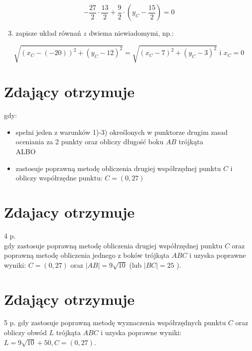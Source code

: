 \documentclass[10pt]{article}
\begin{document}
$$
-\frac{27}{2} \cdot \frac{13}{2}+\frac{9}{2} \cdot\left(y_{C}-\frac{15}{2}\right)=0
$$

\begin{enumerate}
  \setcounter{enumi}{2}
  \item zapisze układ równań $z$ dwiema niewiadomymi, np.:
\end{enumerate}

$$
\sqrt{\left(x_{C}-(-20)\right)^{2}+\left(y_{C}-12\right)^{2}}=\sqrt{\left(x_{C}-7\right)^{2}+\left(y_{C}-3\right)^{2}} \text { i } x_{C}=0
$$

\section*{Zdający otrzymuje}
gdy:

\begin{itemize}
  \item spełni jeden z warunków 1)-3) określonych w punktorze drugim zasad oceniania za 2 punkty oraz obliczy długość boku $A B$ trójkąta\\
ALBO
  \item zastosuje poprawną metodę obliczenia drugiej współrzędnej punktu $C$ i obliczy współrzędne punktu: $C=(0,27)$
\end{itemize}

\section*{Zdajacy otrzymuje}
4 p.\\
gdy zastosuje poprawną metodę obliczenia drugiej współrzędnej punktu $C$ oraz poprawną metodę obliczenia jednego z boków trójkąta $A B C$ i uzyska poprawne wyniki: $C=(0,27)$ oraz $|A B|=9 \sqrt{10}$ (lub $|B C|=25$ ).

\section*{Zdający otrzymuje}
5 p. gdy zastosuje poprawną metodę wyznaczenia współrzędnych punktu $C$ oraz obliczy obwód $L$ trójkąta $A B C$ i uzyska poprawne wyniki: $L=9 \sqrt{10}+50, C=(0,27)$.
\end{document}
